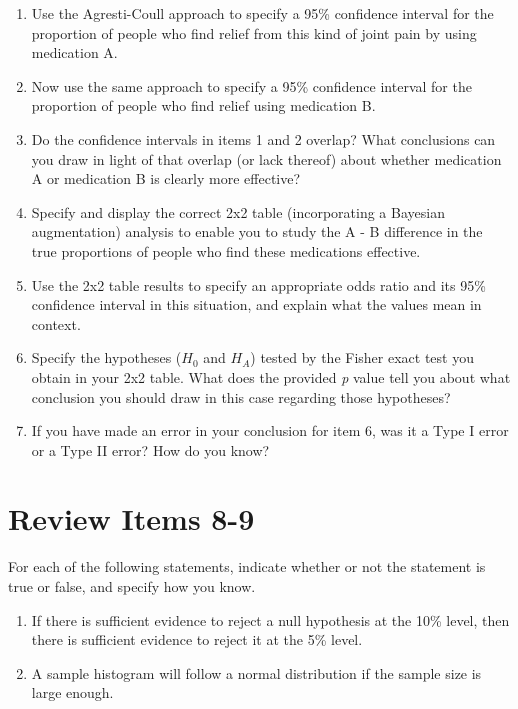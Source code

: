 \documentclass[
]{book}
\providecommand{\tightlist}{%
  \setlength{\itemsep}{0pt}\setlength{\parskip}{0pt}}
\begin{document}
\begin{enumerate}
\def\labelenumi{\arabic{enumi}.}
\tightlist
\item
  Use the Agresti-Coull approach to specify a 95\% confidence interval for the proportion of people who find relief from this kind of joint pain by using medication A.
\item
  Now use the same approach to specify a 95\% confidence interval for the proportion of people who find relief using medication B.
\item
  Do the confidence intervals in items 1 and 2 overlap? What conclusions can you draw in light of that overlap (or lack thereof) about whether medication A or medication B is clearly more effective?
\item
  Specify and display the correct 2x2 table (incorporating a Bayesian augmentation) analysis to enable you to study the A - B difference in the true proportions of people who find these medications effective.
\item
  Use the 2x2 table results to specify an appropriate odds ratio and its 95\% confidence interval in this situation, and explain what the values mean in context.
\item
  Specify the hypotheses (\(H_0\) and \(H_A\)) tested by the Fisher exact test you obtain in your 2x2 table. What does the provided \emph{p} value tell you about what conclusion you should draw in this case regarding those hypotheses?
\item
  If you have made an error in your conclusion for item 6, was it a Type I error or a Type II error? How do you know?
\end{enumerate}

\hypertarget{review-items-8-9}{%
\section{Review Items 8-9}\label{review-items-8-9}}

For each of the following statements, indicate whether or not the statement is true or false, and specify how you know.

\begin{enumerate}
\def\labelenumi{\arabic{enumi}.}
\setcounter{enumi}{7}
\tightlist
\item
  If there is sufficient evidence to reject a null hypothesis at the 10\% level, then there is sufficient evidence to reject it at the 5\% level.
\item
  A sample histogram will follow a normal distribution if the sample size is large enough.
\end{enumerate}
\end{document}

